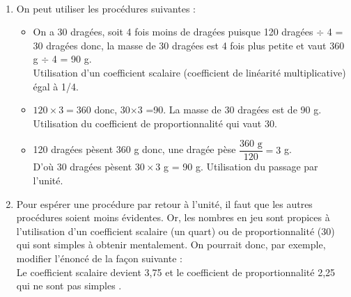 \ \\ [-5mm]
\begin{enumerate}
   \item On peut utiliser les procédures suivantes :
      \begin{itemize}
         \item On a 30 dragées, soit 4 fois moins de dragées puisque 120 dragées $\div$ 4 = 30 dragées donc, la masse de 30 dragées est 4 fois plus petite et vaut 360 g $\div$ 4 = 90 g. \\
            Utilisation d'un coefficient scalaire (coefficient de linéarité multiplicative) égal à 1/4.
         \item $120\times3 =360$ donc, 30$\times$3 =90. La masse de 30 dragées est de 90 g. \\
            Utilisation du coefficient de proportionnalité qui vaut 30.
         \item 120 dragées pèsent 360 g donc, une dragée pèse $\dfrac{360\text{ g}}{120} =3$ g. \\
            D'où 30 dragées pèsent $30\times3$ g = 90 g. Utilisation du passage par l'unité.
      \end{itemize}
   \item Pour \og espérer \fg{} une procédure par retour à l'unité, il faut que les autres procédures soient moins évidentes. Or, les nombres en jeu sont propices à l'utilisation d'un coefficient scalaire (un quart) ou de proportionnalité (30) qui sont simples à obtenir mentalement. On pourrait donc, par exemple, modifier l'énoncé de la façon suivante :
   \medskip
    \\
      Le coefficient scalaire devient 3,75 et le coefficient de proportionnalité 2,25 qui ne sont pas \og simples \fg.
\end{enumerate}
